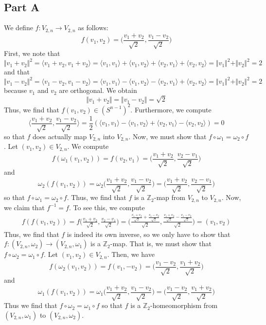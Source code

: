 \documentclass[12pt]{article}
\newcommand{\zz}{\mathbb Z}
\begin{document}
\subsection*{Part A}
We define $f: V_{2,n} \rightarrow V_{2,n}$ as follows:
\[
f(v_1,v_2) = \bigg(\frac{v_1+v_2}{\sqrt{2}}, \frac{v_1 - v_2}{\sqrt{2}}\bigg)
\] First, we note that
\[
\Vert v_1 + v_2 \Vert^2 = \langle v_1 + v_2, v_1 + v_2 \rangle = \langle v_1, v_1 \rangle + \langle v_1, v_2 \rangle + \langle v_2, v_1 \rangle + \langle v_2, v_2 \rangle = \Vert v_1 \Vert^2 + \Vert v_2 \Vert^2 = 2  
\] and that
\[
\Vert v_1 - v_2 \Vert^2 = \langle v_1 - v_2, v_1 - v_2 \rangle = \langle v_1, v_1 \rangle - \langle v_1, v_2 \rangle - \langle v_2, v_1 \rangle + \langle v_2, v_2 \rangle = \Vert v_1 \Vert^2 + \Vert v_2 \Vert^2 = 2  
\] because $v_1$ and $v_2$ are orthogonal. We obtain
\[
\Vert v_1 + v_2 \Vert = \Vert v_1 - v_2 \Vert = \sqrt{2}
\]
 Thus, we find that $f(v_1,v_2) \in (S^{n-1})^2$. Furthermore, we compute
\[
\bigg \langle \frac{v_1+v_2}{\sqrt{2}}, \frac{v_1 - v_2}{\sqrt{2}} \bigg \rangle = \frac{1}{2}(\langle v_1, v_1\rangle - \langle v_1, v_2 \rangle + \langle v_2, v_1 \rangle - \langle v_2, v_2 \rangle) = 0
\] so that $f$ does actually map $V_{2,n}$ into $V_{2,n}$. Now, we must show that $f \circ \omega_1 = \omega_2 \circ f$. Let $(v_1,v_2) \in V_{2,n}$. We compute
\[
f(\omega_1(v_1,v_2)) = f(v_2,v_1) = \bigg(\frac{v_1+v_2}{\sqrt{2}}, \frac{v_2 - v_1}{\sqrt{2}}\bigg)
\] and 
\[
\omega_2(f(v_1,v_2)) = \omega_2\bigg(\frac{v_1+v_2}{\sqrt{2}}, \frac{v_1 - v_2}{\sqrt{2}}\bigg) = \bigg(\frac{v_1+v_2}{\sqrt{2}}, \frac{v_2 - v_1}{\sqrt{2}}\bigg)
\] so that $f \circ \omega_1 = \omega_2 \circ f$. Thus, we find that $f$ is a $\zz_2$-map from $V_{2,n}$ to $V_{2,n}$. Now, we claim that $f^{-1} = f$. To see this, we compute
\begin{align*}
f(f(v_1,v_2)) = f\bigg(\frac{v_1+v_2}{\sqrt{2}}, \frac{v_2 - v_1}{\sqrt{2}}\bigg) = \Bigg(\frac{\frac{v_1+v_2}{\sqrt{2}} + \frac{v_1-v_2}{\sqrt{2}}}{\sqrt{2}}, \frac{\frac{v_1+v_2}{\sqrt{2}} - \frac{v_1-v_2}{\sqrt{2}}}{\sqrt{2}}\Bigg) = (v_1,v_2)
\end{align*} Thus, we find that $f$ is indeed its own inverse, so we only have to show that $f: (V_{2,n}, \omega_2) \rightarrow (V_{2,n},\omega_1)$ is a $\zz_2$-map. That is, we must show that $f \circ \omega_2 = \omega_1 \circ f$. Let $(v_1, v_2) \in V_{2,n}$. Then, we have
\[
f(\omega_2(v_1,v_2)) = f(v_1,-v_2) = \bigg(\frac{v_1 - v_2}{\sqrt{2}}, \frac{v_1+v_2}{\sqrt{2}}\bigg)
\] and
\[
\omega_1(f(v_1,v_2)) = \omega_1\bigg(\frac{v_1 + v_2}{\sqrt{2}}, \frac{v_1-v_2}{\sqrt{2}}\bigg) = \bigg(\frac{v_1 - v_2}{\sqrt{2}}, \frac{v_1+v_2}{\sqrt{2}}\bigg)
\] Thus we find that $f \circ \omega_2 = \omega_1 \circ f$ so that $f$ is a $\zz_2$-homeomorphism from $(V_{2,n},\omega_1)$ to $(V_{2,n},\omega_2)$.
\newpage
\end{document}
